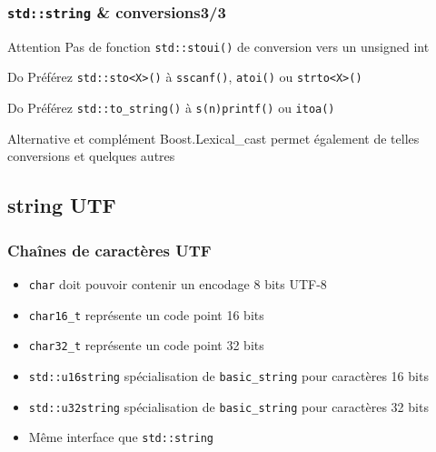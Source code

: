 \documentclass[C++.tex]{subfiles}
\begin{document}
\begin{frame}[fragile]
	\frametitle{\lstinline|std::string| \& conversions\titlehfill{}3/3}
	\begin{alertblock}{Attention}
		Pas de fonction \lstinline|std::stoui()| de conversion vers un unsigned int
	\end{alertblock}

	\begin{exampleblock}{Do}
		Préférez \lstinline|std::sto<X>()| à \lstinline|sscanf()|, \lstinline|atoi()| ou \lstinline|strto<X>()|
	\end{exampleblock}

	\begin{exampleblock}{Do}
		Préférez \lstinline|std::to_string()| à \lstinline|s(n)printf()| ou \lstinline|itoa()|
	\end{exampleblock}

	\begin{block}{Alternative et complément}
		Boost.Lexical\_cast permet également de telles conversions et quelques autres
	\end{block}
\end{frame}

\subsection*{string UTF}
\begin{frame}[fragile]
	\frametitle{Chaînes de caractères UTF}
	\begin{itemize}
		\item \lstinline|char| doit pouvoir contenir un encodage 8 bits UTF-8


		\item \lstinline|char16_t| représente un code point 16 bits
		\item \lstinline|char32_t| représente un code point 32 bits
		\item \lstinline|std::u16string| spécialisation de \lstinline|basic_string| pour caractères 16 bits
		\item \lstinline|std::u32string| spécialisation de \lstinline|basic_string| pour caractères 32 bits
		\item Même interface que \lstinline|std::string|
	\end{itemize}
\end{frame}
\end{document}
